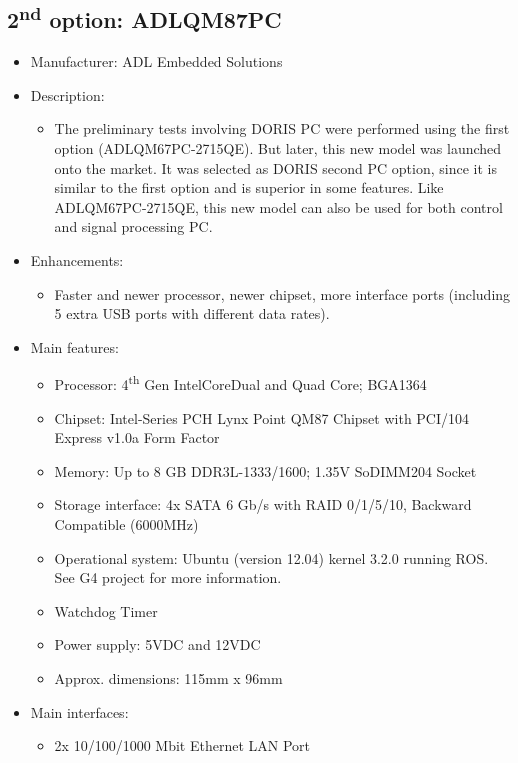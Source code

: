\subsection{2\textsuperscript{nd} option: ADLQM87PC}
\begin{itemize}
  \item Manufacturer: ADL Embedded Solutions\texttrademark
  \item Description:
  \begin{itemize}
    \item The preliminary tests involving DORIS PC were performed using the first option (ADLQM67PC-2715QE). But later, this new model was launched onto the market. It was selected as DORIS second PC option, since it is similar to the first option and is superior in some features. Like ADLQM67PC-2715QE, this new model can also be used for both control and signal processing PC.
  \end{itemize}
    \item Enhancements:
  \begin{itemize}
    \item Faster and newer processor, newer chipset, more interface ports (including 5 extra USB ports with different data rates).
  \end{itemize}
  \item Main features:
  \begin{itemize}
    \item Processor: 4\textsuperscript{th} Gen Intel\textregistered Core\texttrademark Dual and Quad Core; BGA1364
    \item Chipset: Intel-Series PCH Lynx Point QM87 Chipset with PCI/104 Express v1.0a Form Factor
    \item Memory: Up to 8 GB DDR3L-1333/1600; 1.35V SoDIMM204 Socket
    \item Storage interface: 4x SATA 6 Gb/s with RAID 0/1/5/10, Backward Compatible (6000MHz)
    \item Operational system: Ubuntu (version 12.04) kernel 3.2.0 running ROS. See G4 project for more information.
    \item Watchdog Timer
    \item Power supply: 5VDC and 12VDC
    \item Approx. dimensions: 115mm x 96mm
  \end{itemize}
  \item Main interfaces:
  \begin{itemize}
    \item 2x 10/100/1000 Mbit Ethernet LAN Port

\end{itemize}
\end{itemize}

